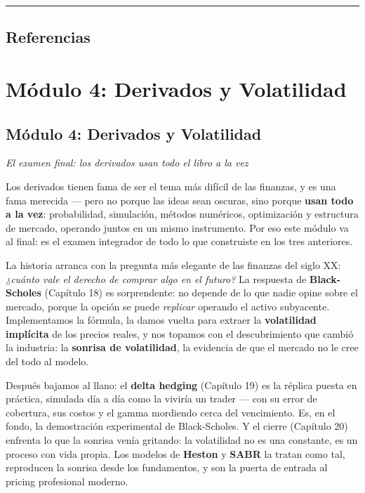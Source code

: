 \documentclass[
  spanish,
  letterpaper,
  DIV=11,
  numbers=noendperiod]{scrreprt}
\begin{document}
\begin{center}\rule{0.5\linewidth}{0.5pt}\end{center}

\chapter{Referencias}\label{referencias-16}

\label{refs}

\part{Módulo 4: Derivados y Volatilidad}

\chapter*{Módulo 4: Derivados y
Volatilidad}\label{muxf3dulo-4-derivados-y-volatilidad-1}


\emph{El examen final: los derivados usan todo el libro a la vez}

Los derivados tienen fama de ser el tema más difícil de las finanzas, y
es una fama merecida --- pero no porque las ideas sean oscuras, sino
porque \textbf{usan todo a la vez}: probabilidad, simulación, métodos
numéricos, optimización y estructura de mercado, operando juntos en un
mismo instrumento. Por eso este módulo va al final: es el examen
integrador de todo lo que construiste en los tres anteriores.

La historia arranca con la pregunta más elegante de las finanzas del
siglo XX: \emph{¿cuánto vale el derecho de comprar algo en el futuro?}
La respuesta de \textbf{Black-Scholes} (Capítulo 18) es sorprendente: no
depende de lo que nadie opine sobre el mercado, porque la opción se
puede \emph{replicar} operando el activo subyacente. Implementamos la
fórmula, la damos vuelta para extraer la \textbf{volatilidad implícita}
de los precios reales, y nos topamos con el descubrimiento que cambió la
industria: la \textbf{sonrisa de volatilidad}, la evidencia de que el
mercado no le cree del todo al modelo.

Después bajamos al llano: el \textbf{delta hedging} (Capítulo 19) es la
réplica puesta en práctica, simulada día a día como la viviría un trader
--- con su error de cobertura, sus costos y el gamma mordiendo cerca del
vencimiento. Es, en el fondo, la demostración experimental de
Black-Scholes. Y el cierre (Capítulo 20) enfrenta lo que la sonrisa
venía gritando: la volatilidad no es una constante, es un proceso con
vida propia. Los modelos de \textbf{Heston} y \textbf{SABR} la tratan
como tal, reproducen la sonrisa desde los fundamentos, y son la puerta
de entrada al pricing profesional moderno.
\end{document}
